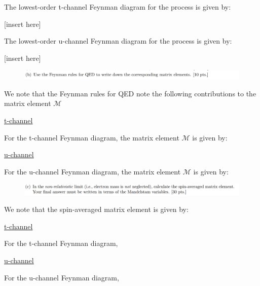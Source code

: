 \documentclass[11pt]{article}
\theoremstyle{definition}
\numberwithin{equation}{section}
\begin{document}
The lowest-order t-channel Feynman diagram for the process is given by:

[insert here]

The lowest-order u-channel Feynman diagram for the process is given by:

[insert here]

\newpage



\begin{figure}[H]
    \centering
    \includegraphics[scale = 0.4]{2b.png}
\end{figure}

We note that the Feynman rules for QED note the following contributions to the matrix element $\mathcal{M}$

\underline{t-channel}

For the t-channel Feynman diagram, the matrix element $\mathcal{M}$ is given by:

\underline{u-channel}

For the u-channel Feynman diagram, the matrix element $\mathcal{M}$ is given by:
\newpage


\begin{figure}[H]
    \centering
    \includegraphics[scale = 0.4]{2c.png}
\end{figure}

We note that the spin-averaged matrix element is given by:

\underline{t-channel}

For the t-channel Feynman diagram, 

\underline{u-channel}

For the u-channel Feynman diagram,
\end{document}
